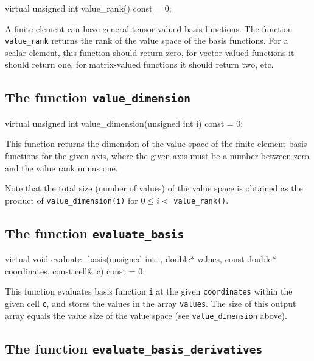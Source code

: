 \begin{code}
virtual unsigned int value_rank() const = 0;
\end{code}

A finite element can have general tensor-valued basis functions.  The
function \texttt{value\_rank} returns the rank of the value space of
the basis functions. For a scalar element, this function should return
zero, for vector-valued functions it should return one, for
matrix-valued functions it should return two, etc.

\subsection{The function \texttt{value\_dimension}}

\begin{code}
virtual unsigned int
value_dimension(unsigned int i) const = 0;
\end{code}

This function returns the dimension of the value space of the finite
element basis functions for the given axis, where the given axis must
be a number between zero and the value rank minus one.

Note that the total size (number of values) of the value space is
obtained as the product of \texttt{value\_dimension(i)} for $0 \le i <$
\texttt{value\_rank()}.

\subsection{The function \texttt{evaluate\_basis}}

\begin{code}
virtual void evaluate_basis(unsigned int i,
                            double* values,
                            const double* coordinates,
                            const cell& c) const = 0;
\end{code}

This function evaluates basis function \texttt{i} at the given
\texttt{coordinates} within the given cell \texttt{c}, and stores the
values in the array \texttt{values}. The size of this output array
equals the value size of the value space (see \texttt{value\_dimension} above).

\subsection{The function \texttt{evaluate\_basis\_derivatives}}

